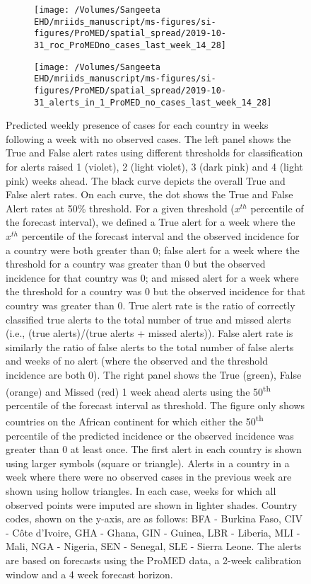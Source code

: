 \documentclass[9pt,twoside,lineno]{pnas-new}
\begin{document}
\begin{figure}
\centering
\begin{subfigure}[b]{0.45\textwidth}
\texttt{[image: /Volumes/Sangeeta EHD/mriids\_manuscript/ms-figures/si-figures/ProMED/spatial\_spread/2019-10-31\_roc\_ProMEDno\_cases\_last\_week\_14\_28]}
\end{subfigure}
\begin{subfigure}[b]{0.45\textwidth}
\texttt{[image: /Volumes/Sangeeta
  EHD/mriids\_manuscript/ms-figures/si-figures/ProMED/spatial\_spread/2019-10-31\_alerts\_in\_1\_ProMED\_no\_cases\_last\_week\_14\_28]}
\end{subfigure}
\caption{Predicted weekly presence of cases for each 
country in weeks following a week with no observed cases. 
The left panel shows the True and False alert rates using
different thresholds for classification for alerts raised 1 (violet), 2
(light violet), 3 (dark pink) and 4 (light pink) weeks ahead. The
black curve depicts the overall True and False alert rates. On each
curve, the dot shows the True and False Alert rates at 50\% threshold.
For a given threshold (\(x^{th}\)
percentile of the forecast interval), we defined a True alert for a week
where the \(x^{th}\) percentile of the forecast interval and the
observed incidence for a country were both greater than 0; false alert
for a week where the threshold for a country was greater than 0 but the
observed incidence for that country was 0; and missed alert for a week where
the threshold for a country was 0 but the observed incidence for that
country was greater than 0. True alert rate is the ratio of correctly
classified true alerts to the total number of true and missed alerts
(i.e., (true alerts)/(true alerts + missed alerts)). False alert rate is
similarly the ratio of false alerts to the total number of false alerts
and weeks of no alert (where the observed and the threshold incidence
are both 0). The right panel shows the True (green), False (orange) and
Missed (red) 1 week ahead alerts using the 50\textsuperscript{th} percentile of the
forecast interval as threshold. 
The figure only shows countries on the
African continent for which either the 50\textsuperscript{th}
percentile of the predicted incidence or the
observed incidence was greater than 0 at least once. 
The first alert in each country is shown
using larger symbols (square or triangle). Alerts in a country in a
week where there were no observed cases in the previous week are shown
using hollow triangles. In each case, weeks for which all observed points
were imputed are shown in lighter shades.
Country codes, shown on the y-axis, are as
follows: BFA - Burkina Faso, CIV - Côte d'Ivoire,
GHA - Ghana, GIN - Guinea, LBR - Liberia, MLI - Mali, NGA - Nigeria,
SEN - Senegal, SLE - Sierra Leone. The alerts are based on forecasts 
using the ProMED data, a 2-week calibration window and a 4 week
forecast horizon.}
\label{fig:rocnocases}
\end{figure}\FloatBarrier
\end{document}
